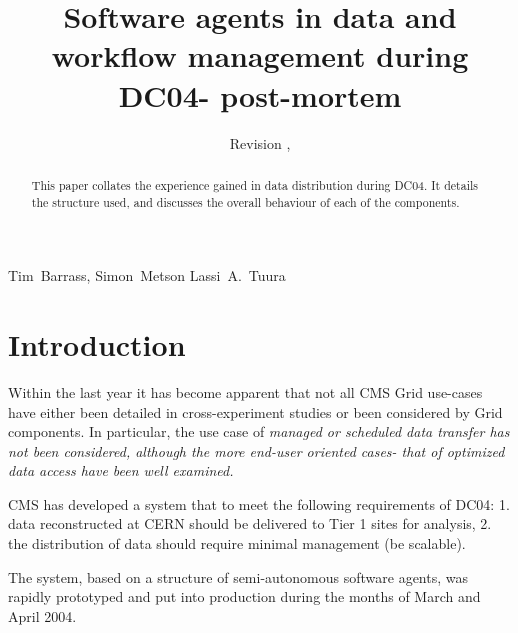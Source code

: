 \documentclass{cmspaper}
\begin{document}
\begin{titlepage}
  \whitepaper %
  \date{Revision \RCSRevision, \RCSDate}
  \title{Software agents in data and workflow management during DC04- post-mortem}

  \begin{Authlist}
    Tim~Barrass, Simon~Metson
    Lassi~A.~Tuura
  \end{Authlist}


  \begin{abstract}
	This paper collates the experience gained in data distribution during
	DC04. It details the structure used, and discusses the overall behaviour
	of each of the components.
  \end{abstract} 

\end{titlepage}

\setcounter{page}{2}

\section{Introduction}
Within the last year it has become apparent that not all CMS Grid use-cases
have either been detailed in cross-experiment studies or been
considered by Grid components. In particular, the use case of
\em{managed or scheduled data transfer} has not been considered, although
the more end-user oriented cases- that of \em{optimized data access} have
been well examined.

CMS has developed a system that to meet the following requirements of DC04:
1. data reconstructed at CERN should be delivered to Tier 1 sites for
analysis, 2. the distribution of data should require minimal management (be
scalable).

The system, based on a structure of semi-autonomous software agents, was
rapidly prototyped and put into production during the months of March and
April 2004.
\end{document}
